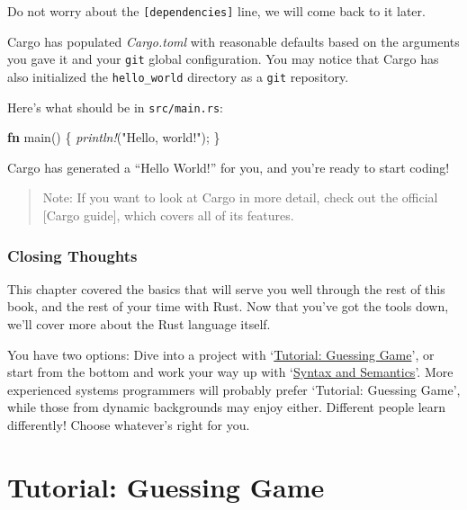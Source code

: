 \documentclass[a4paper,]{book}
\newenvironment{Shaded}{\begin{snugshade}}{\end{snugshade}}
\newcommand{\KeywordTok}[1]{\textcolor[rgb]{0.13,0.29,0.53}{\textbf{{#1}}}}
\newcommand{\StringTok}[1]{\textcolor[rgb]{0.31,0.60,0.02}{{#1}}}
\newcommand{\PreprocessorTok}[1]{\textcolor[rgb]{0.56,0.35,0.01}{\textit{{#1}}}}
\newcommand{\NormalTok}[1]{{#1}}
\begin{document}
Do not worry about the \texttt{{[}dependencies{]}} line, we will come
back to it later.

Cargo has populated \emph{Cargo.toml} with reasonable defaults based on
the arguments you gave it and your \texttt{git} global configuration.
You may notice that Cargo has also initialized the \texttt{hello\_world}
directory as a \texttt{git} repository.

Here's what should be in \texttt{src/main.rs}:

\begin{Shaded}
\begin{Highlighting}[]
\KeywordTok{fn} \NormalTok{main() \{}
    \PreprocessorTok{println!}\NormalTok{(}\StringTok{"Hello, world!"}\NormalTok{);}
\NormalTok{\}}
\end{Highlighting}
\end{Shaded}

Cargo has generated a ``Hello World!'' for you, and you're ready to
start coding!

\begin{quote}
Note: If you want to look at Cargo in more detail, check out the
official {[}Cargo guide{]}, which covers all of its features.
\end{quote}

\subsection{Closing Thoughts}\label{closing-thoughts}

This chapter covered the basics that will serve you well through the
rest of this book, and the rest of your time with Rust. Now that you've
got the tools down, we'll cover more about the Rust language itself.

You have two options: Dive into a project with
`\protect\hyperlink{sec--guessing-game}{Tutorial: Guessing Game}', or
start from the bottom and work your way up with
`\protect\hyperlink{sec--syntax-and-semantics}{Syntax and Semantics}'.
More experienced systems programmers will probably prefer `Tutorial:
Guessing Game', while those from dynamic backgrounds may enjoy either.
Different people learn differently! Choose whatever's right for you.

\hypertarget{sec--guessing-game}{\chapter{Tutorial: Guessing
Game}\label{sec--guessing-game}}
\end{document}
